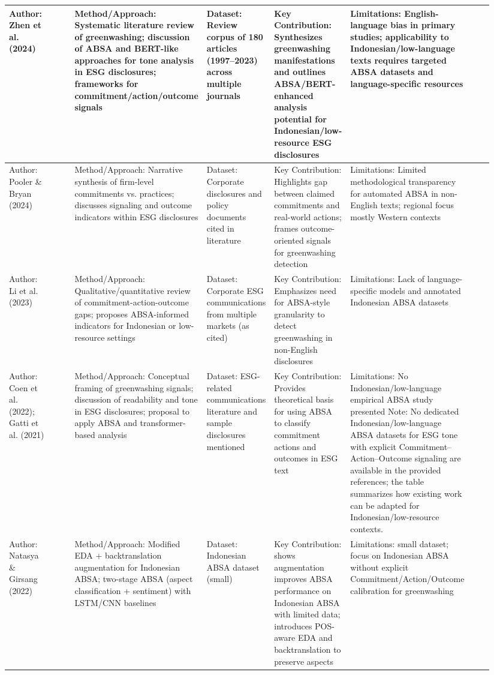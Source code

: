 \documentclass{article}
\begin{document}
\begin{landscape}
\begin{longtable}{p{0.134\linewidth} p{0.134\linewidth} p{0.134\linewidth} p{0.134\linewidth} p{0.134\linewidth} p{0.134\linewidth} p{0.134\linewidth}}
Author: Zhen et al. (2024) & ~ & Method/Approach: Systematic literature review of greenwashing; discussion of ABSA and BERT-like approaches for tone analysis in ESG disclosures; frameworks for commitment/action/outcome signals & Dataset: Review corpus of 180 articles (1997–2023) across multiple journals & Key Contribution: Synthesizes greenwashing manifestations and outlines ABSA/BERT-enhanced analysis potential for Indonesian/low-resource ESG disclosures & Limitations: English-language bias in primary studies; applicability to Indonesian/low-language texts requires targeted ABSA datasets and language-specific resources & ~ \\ \hline
Author: Pooler \& Bryan (2024) & ~ & Method/Approach: Narrative synthesis of firm-level commitments vs. practices; discusses signaling and outcome indicators within ESG disclosures & Dataset: Corporate disclosures and policy documents cited in literature & Key Contribution: Highlights gap between claimed commitments and real-world actions; frames outcome-oriented signals for greenwashing detection & Limitations: Limited methodological transparency for automated ABSA in non-English texts; regional focus mostly Western contexts & ~ \\ \hline
Author: Li et al. (2023) & ~ & Method/Approach: Qualitative/quantitative review of commitment-action-outcome gaps; proposes ABSA-informed indicators for Indonesian or low-resource settings & Dataset: Corporate ESG communications from multiple markets (as cited) & Key Contribution: Emphasizes need for ABSA-style granularity to detect greenwashing in non-English disclosures & Limitations: Lack of language-specific models and annotated Indonesian ABSA datasets & ~ \\ \hline
Author: Coen et al. (2022); Gatti et al. (2021) & ~ & Method/Approach: Conceptual framing of greenwashing signals; discussion of readability and tone in ESG disclosures; proposal to apply ABSA and transformer-based analysis & Dataset: ESG-related communications literature and sample disclosures mentioned & Key Contribution: Provides theoretical basis for using ABSA to classify commitment actions and outcomes in ESG text & Limitations: No Indonesian/low-language empirical ABSA study presented Note: No dedicated Indonesian/low-language ABSA datasets for ESG tone with explicit Commitment–Action–Outcome signaling are available in the provided references; the table summarizes how existing work can be adapted for Indonesian/low-resource contexts. & ~ \\ \hline
Author: Natasya \& Girsang (2022) & ~ & Method/Approach: Modified EDA + backtranslation augmentation for Indonesian ABSA; two-stage ABSA (aspect classification + sentiment) with LSTM/CNN baselines & Dataset: Indonesian ABSA dataset (small) & Key Contribution: shows augmentation improves ABSA performance on Indonesian ABSA with limited data; introduces POS-aware EDA and backtranslation to preserve aspects & Limitations: small dataset; focus on Indonesian ABSA without explicit Commitment/Action/Outcome calibration for greenwashing & ~ \\ \hline

\end{longtable}
\end{landscape}
\end{document}
